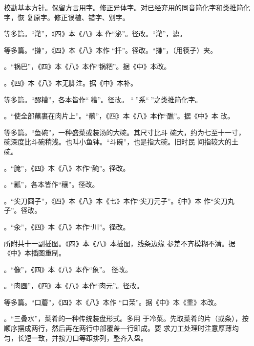 校勘基本方针。保留方言用字。修正异体字。对已经弃用的同音简化字和类推简化字，恢
复原字。修正误植、错字、别字。

\vspace{.5\baselineskip plus .5\baselineskip minus .5\baselineskip}%
{\noindent\null\hfill{}\hfill\null}%
\vspace{1\baselineskip plus .5\baselineskip minus .5\baselineskip}%

等多篇。“滗”，《四》本《八》本
作“泌”。径改。“滗”，滤。

等多篇。“搛”，《四》本《八》本作
“扦”。径改。“搛”，（用筷子）夹。

。“锅巴”，《四》本《八》本作“锅粑”。据《中》本改。

。《四》本《八》本无脚注{\footnotesize{}}。据《中》本补。

等多篇。“醪糟”，各本皆作“𰪿糟”。径改。
“𰪿”系“𫃑”之类推简化字。

。“使全部蘸裹在肉片上”。“蘸”，《四》本《八》本作“醮”。据《中》本
改。

等多篇。“鱼碗”，一种盛菜或装汤的大碗。其尺寸比斗
碗大，约为七至十一寸，碗深度比斗碗稍浅。也叫小鱼钵。“斗碗”，也是指大碗。旧时民
间指较大的土碗。

。“腌”，《四》本《八》本作“醃”。径改。

。“瓤”，各本皆作“穰”。径改。

。“尖刀圆子”，《四》本《八》本《七》本作“尖刀元子”。《中》本
作“尖刀丸子”。径改。

。“汆”，《四》本《八》本作“川”。径改。

所附共十一副插图。《四》本《八》本插图，线条边缘
参差不齐模糊不清。据《中》本插图重制。

。“像”，\null《四》本《八》本作“象”。
径改。

。“肉圆”，《四》本《八》本作“肉元”。径改。

等多篇。“口蘑”，《四》本《八》本作
“口茉”。据《中》本《重》本改。

。“三叠水”，菜肴的一种传统装盘形式。多用
于冷菜。先取菜肴的片（或条），按顺序摆成两行，然后再在两行中部覆盖一行即成。要
求刀工处理时注意厚薄均匀，长短一致，并按刀口等距排列，整齐入盘。

